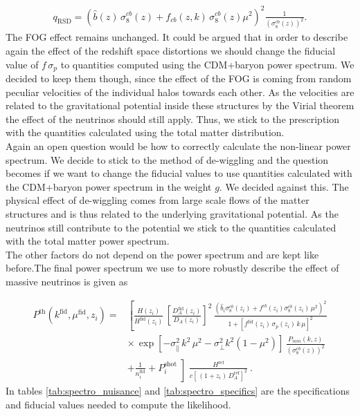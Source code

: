 \documentclass[oneside]{book}
\begin{document}
\begin{align*}
    q_\mathrm{RSD} = \left(\hat{b}(z) \,\sigma_8^{cb}(z)+f_{cb}(z,k) \,\sigma_8^{cb}(z)\mu^2\right)^2 \frac{1}{\left(\sigma_8^{cb}(z)\right)^2} .
\end{align*} 
The FOG effect remains unchanged. It could be argued that in order to describe again the effect of the redshift space distortions we should change the fiducial value of $f\,\sigma_p$ to quantities computed using the CDM+baryon power spectrum. We decided to keep them though, since the effect of the FOG is coming from random peculiar velocities of the individual halos towards each other. As the velocities are related to the gravitational potential inside these structures by the Virial theorem the effect of the neutrinos should still apply. Thus, we stick to the prescription with the quantities calculated using the total matter distribution.\\
Again an open question would be how to correctly calculate the non-linear power spectrum. We decide to stick to the method of de-wiggling and the question becomes if we want to change the fiducial values to use quantities calculated with the CDM+baryon power spectrum in the weight $g$. We decided against this. The physical effect of de-wiggling comes from large scale flows of the matter structures and is thus related to the underlying gravitational potential. As the neutrinos still contribute to the potential we stick to the quantities calculated with the total matter power spectrum.\\
The other factors do not depend on the power spectrum and are kept like before.The final power spectrum we use to more robustly describe the effect of massive neutrinos is given as 

\begin{align}
    P^\mathrm{th}(k^\mathrm{fid},\mu^\mathrm{fid},z_i) =& \left[\frac{H(z_i)}{H^\mathrm{fid}(z_i)}\, \left[\frac{D^\mathrm{fid}_A(z_i)}{D_A(z_i)}\right]^2 \, \frac{\left(\hat{b}_i \sigma^{cb}_8(z_i) + f^{cb}(z_i) \sigma^{cb}_8(z_i) \,\mu^2 \right)^2}{1+\left[f^\mathrm{fid}(z_i)\,\sigma_p(z_i)\,k\,\mu\right]^2} \right. \nonumber\\
    &\times\,\exp\left[- \sigma_\|^2 \, k^2\,\mu^2 - \sigma_\perp^2 k^2 \left(1-\mu^2\right) \right]\, \frac{P_{mm}(k,z)}{\left(\sigma_8^{cb}(z)\right)^2}  \\
    &+ \left.\frac{1}{n_i^\mathrm{fid}} + P_i^\mathrm{shot}\middle] \frac{H^\mathrm{ref}}{c\left[ \,(1+z_i)\,D_A^\mathrm{ref}\right]^2}\right.\:.\nonumber
\end{align} 
In tables \ref{tab:spectro_nuisance} and \ref{tab:spectro_specifics} are the specifications and fiducial values needed to compute the likelihood.
\end{document}

